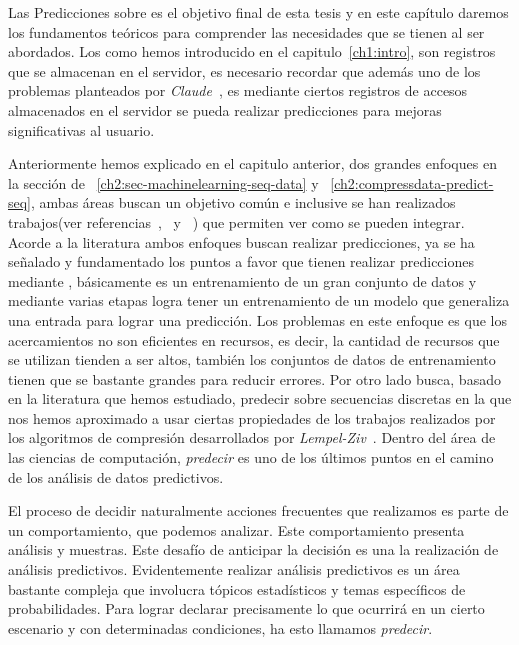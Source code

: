


Las Predicciones sobre \webasccesslog es el objetivo final de esta tesis y en este capítulo daremos los fundamentos teóricos para comprender las necesidades que se tienen al ser abordados. Los \webasccesslog como hemos introducido en el capitulo~\ref{ch1:intro}, son registros que se almacenan en el servidor, es necesario recordar que además uno de los problemas planteados por \emph{Claude}~\etal\cite{Claude2014}, es mediante ciertos registros de accesos almacenados en el servidor se pueda realizar predicciones para mejoras significativas al usuario.

 
Anteriormente hemos explicado en el capitulo anterior, dos grandes enfoques en la sección de \machinelearning~\ref{ch2:sec-machinelearning-seq-data} y \losslessdatacompression~\ref{ch2:compressdata-predict-seq}, ambas áreas buscan un objetivo común e inclusive se han realizados trabajos(ver referencias~\cite{Sculley2006},~\cite{Li2005} y~\cite{Begleiter2004} ) que permiten ver como se pueden integrar. Acorde a la literatura ambos enfoques buscan realizar predicciones, ya se ha señalado y fundamentado los puntos a favor que tienen realizar predicciones mediante \machinelearning, básicamente es un entrenamiento de un gran conjunto de datos y mediante varias etapas logra tener un entrenamiento de un modelo que generaliza una entrada para lograr una predicción. Los problemas en este enfoque es que los acercamientos no son  eficientes en recursos, es decir, la cantidad de recursos que se utilizan tienden a ser altos, también los conjuntos de datos de entrenamiento tienen que se bastante grandes para reducir errores. Por otro lado \losslessdatacompression busca, basado en la literatura que hemos estudiado, predecir sobre secuencias discretas en la que nos hemos aproximado a usar ciertas propiedades de los trabajos realizados por los algoritmos de compresión desarrollados por \emph{Lempel-Ziv}~\cite{ZivLempel1978}. Dentro del área de las ciencias de computación, \emph{predecir} es uno de los últimos puntos en el camino de los análisis de datos predictivos.

El proceso de decidir naturalmente acciones frecuentes que realizamos es parte de un comportamiento, que podemos analizar. Este comportamiento presenta análisis y muestras. Este desafío de anticipar la decisión es una la realización de análisis predictivos. Evidentemente realizar análisis predictivos es un área bastante compleja que involucra tópicos estadísticos y temas específicos de probabilidades. Para lograr declarar precisamente lo que ocurrirá en un cierto escenario y con determinadas condiciones, ha esto llamamos \emph{predecir}.

